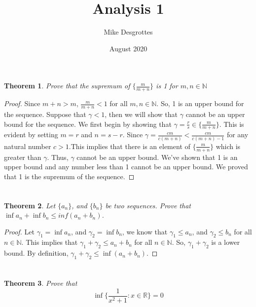 \documentclass{article}
\title{Analysis 1}
\author{Mike Desgrottes}
\date{August 2020}
\theoremstyle{plain}
\newtheorem{theorem}{Theorem}
\theoremstyle{definition}
\begin{document}
\maketitle
 \section{}
 
 \begin{theorem}
 	Prove that the supremum of $\{ \frac{m}{m + n}\}$ is 1 for $m,n \in \mathbb{N}$
 \end{theorem}

\begin{proof}
	Since $m + n > m$, $\frac{m}{m + n} < 1$ for all $m,n \in \mathbb{N}$. So, 1 is an upper bound for the sequence. Suppose that $\gamma < 1$, then we will show that $\gamma$ cannot be an upper bound for the sequence. We first begin by showing that $\gamma = \frac{r}{s} \in \{ \frac{m}{m + n}\}$. This is evident by setting $m = r$ and $n = s - r$. Since $\gamma = \frac{cm}{c(m + n)} < \frac{cm}{c(m + n) - 1}$ for any natural number $c > 1$.This implies that there is an element of $\{ \frac{m}{m + n}\}$ which is greater than $\gamma$. Thus, $\gamma$ cannot be an upper bound. We've shown that 1 is an upper bound and any number less than 1 cannot be an upper bound. We proved that 1 is the supremum of the sequence.
\end{proof}
\section{}
\begin{theorem}
Let $\{a_{n}\}$, and $\{ b_{n}\}$ be two sequences. Prove that $\inf a_{n} + \inf b_{n} \leq inf(a_{n} + b_{n})$.
\end{theorem}
\begin{proof}
Let $\gamma_{1} = \inf a_{n}$, and $\gamma_{2} = \inf b_{n}$, we know that $\gamma_{1} \leq a_{n}$, and $\gamma_{2} \leq b_{n}$ for all $n \in \mathbb{N}$. This implies that $\gamma_{1} + \gamma_{2} \leq a_{n} + b_{n}$ for all $n \in \mathbb{N}$. So, $\gamma_{1} + \gamma_{2}$ is a lower bound. By definition, $\gamma_{1} + \gamma_{2} \leq \inf (a_{n} + b_{n})$.
\end{proof}

\section{}
\begin{theorem}
Prove that $$ \inf \{ \frac{1}{x^2 + 1}: x \in \mathbb{R} \} = 0$$
\end{theorem}
\end{document}
